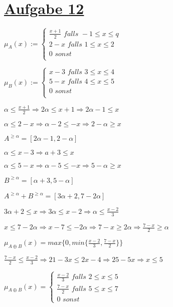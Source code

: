 \section*{\underline{Aufgabe 12}}


$
\mu_A(x) := \begin{cases} 
	\frac{x+1}{2} \textit{ falls }  -1 \leq x \leq q  \\
	2-x           \textit{ falls }  1 \leq x \leq 2 \\
	0			  \textit{ sonst}	\\
\end{cases} 
$

$
\mu_B(x) := \begin{cases} 
	x-3 \textit{ falls }  3 \leq x \leq 4  \\
	5-x           \textit{ falls }  4 \leq x \leq 5 \\
	0			  \textit{ sonst}	\\
\end{cases} 
$

\hfill

$\alpha \leq \frac{x+1}{2} \Rightarrow 2\alpha \leq x+1 \Rightarrow 2\alpha-1 \leq x$

$\alpha \leq 2-x \Rightarrow \alpha -2 \leq -x \Rightarrow 2-\alpha \geq x$

$A^{\geq\alpha} = [2\alpha-1,2-\alpha]$

\hfill

$\alpha \leq x-3 \Rightarrow a+3 \leq x$

$\alpha \leq 5-x \Rightarrow \alpha-5 \leq -x \Rightarrow 5-\alpha \geq x $

$B^{\geq\alpha} = [\alpha+3 ,5-\alpha]$

\hfill

$A^{\geq\alpha}+B^{\geq\alpha} = [3\alpha+2,7-2\alpha]$

\hfill

$3\alpha+2 \leq x \Rightarrow 3\alpha \leq x-2 \Rightarrow \alpha \leq \frac{x-2}{3}$

$x \leq 7-2\alpha \Rightarrow x-7 \leq -2 \alpha \Rightarrow 7-x \geq 2\alpha \Rightarrow \frac{7-x}{2} \geq \alpha$

$\mu_{A\oplus B}(x) = max\{0,min\{\frac{x-2}{3},\frac{7-x}{2}\}\}$

\hfill

$\frac{7-x}{2} \leq \frac{x-2}{3} \Rightarrow 21 -3x \leq 2x-4 \Rightarrow 25 -5x \Rightarrow x \leq 5$

$\mu_{A\oplus B}(x) = \begin{cases}
\frac{x-2}{3} \textit{ falls } 2 \leq x \leq 5 \\
\frac{7-x}{2} \textit{ falls } 5 \leq x \leq 7 \\
0 \textit{ sonst}
\end{cases}
$
